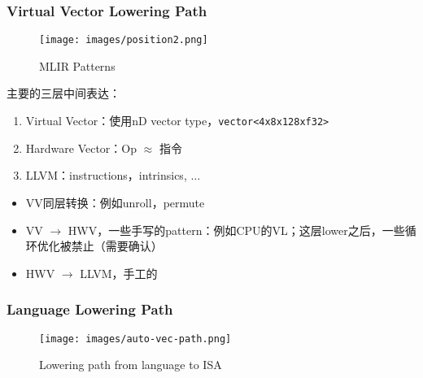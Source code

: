 \documentclass[aspectratio=169]{ctexbeamer}
\begin{document}
\begin{frame}
    \frametitle{Virtual Vector Lowering Path}
    \noindent
    \begin{minipage}[t]{0.50\linewidth}
        \begin{figure}
            \centering
            \texttt{[image: images/position2.png]}
            \caption{MLIR Patterns}
        \end{figure}
    \end{minipage}%
    \hfill%
    \begin{minipage}[t]{0.45\linewidth}
        主要的三层中间表达：
        \begin{enumerate}
            \item Virtual Vector：使用nD vector type，\texttt{vector<4x8x128xf32>}
            \item Hardware Vector：Op $\approx$ 指令
            \item LLVM：instructions，intrinsics, $\dots$
        \end{enumerate}

        \begin{itemize}
            \item VV同层转换：例如unroll，permute
            \item VV $\rightarrow$ HWV，一些手写的pattern：例如CPU的VL；这层lower之后，一些循环优化被禁止（需要确认）
            \item HWV $\rightarrow$ LLVM，手工的
        \end{itemize}
    \end{minipage}
\end{frame}

\begin{frame}
    \frametitle{Language Lowering Path}
    \begin{figure}
        \centering
        \texttt{[image: images/auto-vec-path.png]}
        \caption{Lowering path from language to ISA}
    \end{figure}
\end{frame}
\end{document}
